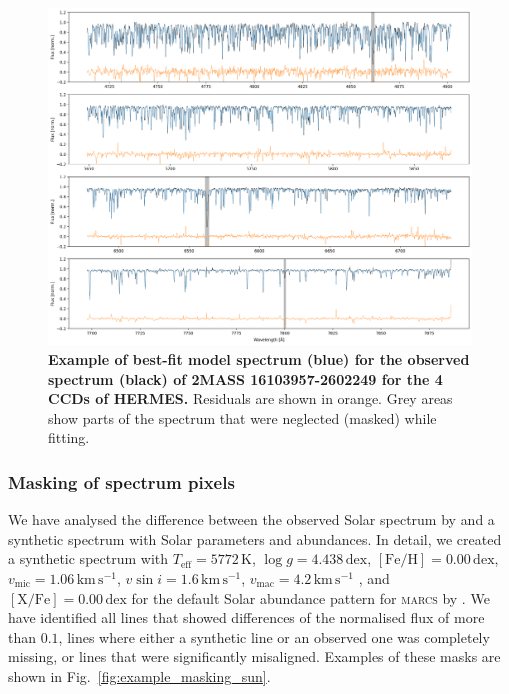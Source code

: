\documentclass[
  journal=pasa,
  manuscript=research-paper, %
  year=2021,
  volume=37,
]{cup-journal}
\newcommand{\marcs}{\textsc{marcs}\xspace}
\newcommand{\dex}{\,\mathrm{dex}}	%
\newcommand{\K}{\,\mathrm{K}}	%
\newcommand{\kms}{\,\mathrm{km\,s^{-1}}}	%
\begin{document}
\begin{figure}[hbt!]
 \centering
 \includegraphics[width=\textwidth]{figures/150606003401143_mcmc_median.png}
 \caption{
 \textbf{Example of best-fit model spectrum (blue) for the observed spectrum (black) of 2MASS 16103957-2602249 for the 4 CCDs of HERMES.}
 Residuals are shown in orange. Grey areas show parts of the spectrum that were neglected (masked) while fitting.
 }
 \label{fig:best_fit_spectrum}
\end{figure}

\subsubsection{Masking of spectrum pixels}

We have analysed the difference between the observed Solar spectrum by \citet{Hinkle2000} and a synthetic spectrum with Solar parameters and abundances. In detail, we created a synthetic spectrum with $T_\text{eff} = 5772\K$, $\log g = 4.438\dex$, $\mathrm{[Fe/H]} = 0.00\dex$, $v_\text{mic} = 1.06\kms$, $v \sin i = 1.6\kms$, $v_\text{mac} = 4.2\kms$ \citep{Prsa2016, Jofre2017}, and $\mathrm{[X/Fe]} = 0.00\dex$ for the default Solar abundance pattern for \marcs by \citet{Grevesse2007}. We have identified all lines that showed differences of the normalised flux of more than $0.1$, lines where either a synthetic line or an observed one was completely missing, or lines that were significantly misaligned. Examples of these masks are shown in Fig.~\ref{fig:example_masking_sun}.
\end{document}
